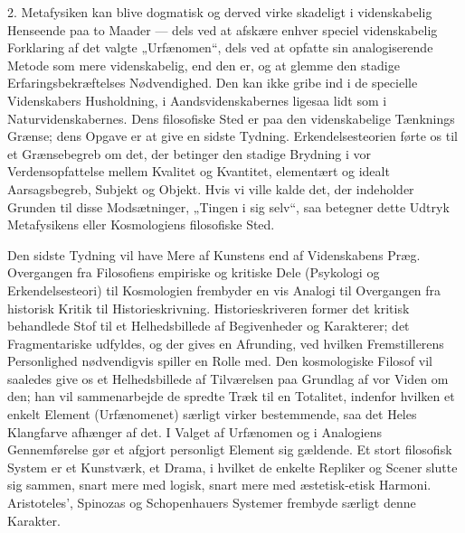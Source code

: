 \documentclass[12pt,a4paper,openany]{book}
\newcommand{\opage}[1]{\marginnote{\footnotesize\textit{[#1]}}}
\begin{document}
2. Metafysiken kan blive dogmatisk og derved virke skadeligt i videnskabelig
Henseende paa to Maader --- dels ved at afskære enhver speciel videnskabelig
Forklaring af det valgte „Urfænomen“, dels ved at opfatte sin analogiserende
Metode som mere videnskabelig, end den er, og at glemme den stadige
Erfaringsbekræftelses Nødvendighed. Den kan ikke gribe ind i de specielle
Videnskabers Husholdning, i Aandsvidenskabernes ligesaa lidt som i
Naturvidenskabernes. Dens filosofiske Sted er paa den videnskabelige Tænknings
Grænse; dens Opgave er at give en sidste Tydning. Erkendelsesteorien førte os
til et Grænsebegreb om det, der betinger den stadige Brydning i vor
Verdensopfattelse mellem Kvalitet og Kvantitet, elementært og idealt
Aarsagsbegreb, Subjekt og Objekt. Hvis vi ville kalde det, der indeholder
Grunden til disse Modsætninger, „Tingen i sig selv“, saa betegner dette Udtryk
Metafysikens eller Kosmologiens filosofiske Sted.

Den sidste Tydning vil have Mere af Kunstens end af Videnskabens Præg.
Overgangen fra Filosofiens empiriske og kritiske Dele (Psykologi og
Erkendelsesteori) til Kosmologien frembyder
\opage{58}en vis Analogi til Overgangen fra historisk Kritik til
Historieskrivning. Historieskriveren former det kritisk behandlede Stof til et
Helhedsbillede af Begivenheder og Karakterer; det Fragmentariske udfyldes, og
der gives en Afrunding, ved hvilken Fremstillerens Personlighed nødvendigvis
spiller en Rolle med. Den kosmologiske Filosof vil saaledes give os et
Helhedsbillede af Tilværelsen paa Grundlag af vor Viden om den; han vil
sammenarbejde de spredte Træk til en Totalitet, indenfor hvilken et enkelt
Element (Urfænomenet) særligt virker bestemmende, saa det Heles Klangfarve
afhænger af det. I Valget af Urfænomen og i Analogiens Gennemførelse gør et
afgjort personligt Element sig gældende. Et stort filosofisk System er et
Kunstværk, et Drama, i hvilket de enkelte Repliker og Scener slutte sig sammen,
snart mere med logisk, snart mere med æstetisk-etisk Harmoni. Aristoteles',
Spinozas og Schopenhauers Systemer frembyde særligt denne Karakter.
\end{document}
